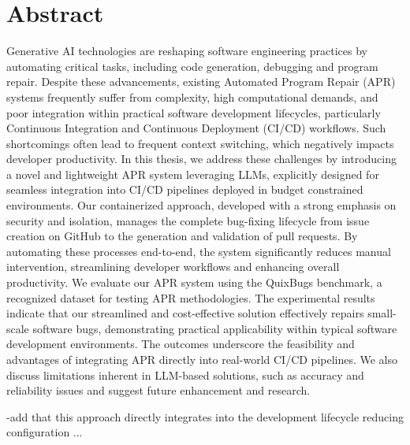 \thispagestyle{empty}       %

\section*{Abstract}
Generative AI technologies are reshaping software engineering practices by automating critical tasks, including code generation, debugging and program repair. Despite these advancements, existing Automated Program Repair (APR) systems frequently suffer from complexity, high computational demands, and poor integration within practical software development lifecycles, particularly Continuous Integration and Continuous Deployment (CI/CD) workflows. Such shortcomings often lead to frequent context switching, which negatively impacts developer productivity. \break
In this thesis, we address these challenges by introducing a novel and lightweight APR system leveraging LLMs, explicitly designed for seamless integration into CI/CD pipelines deployed in budget constrained environments. Our containerized approach, developed with a strong emphasis on security and isolation, manages the complete bug-fixing lifecycle from issue creation on GitHub to the generation and validation of pull requests. By automating these processes end-to-end, the system significantly reduces manual intervention, streamlining developer workflows and enhancing overall productivity.\break
We evaluate our APR system using the QuixBugs benchmark, a recognized dataset for testing APR methodologies. The experimental results indicate that our streamlined and cost-effective solution effectively repairs small-scale software bugs, demonstrating practical applicability within typical software development environments. \break
The outcomes underscore the feasibility and advantages of integrating APR directly into real-world CI/CD pipelines. We also discuss limitations inherent in LLM-based solutions, such as accuracy and reliability issues and suggest future enhancement and research.


-add that this approach directly integrates into the development lifecycle reducing configuration ...
